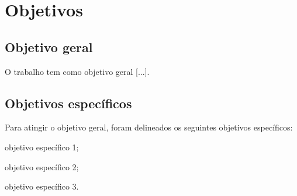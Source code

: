 \chapter{Objetivos}

\section{Objetivo geral}
O trabalho tem como objetivo geral [...].

\section{Objetivos específicos}
Para atingir o objetivo geral, foram delineados os seguintes objetivos específicos:
\begin{alineas}
  \item objetivo específico 1;
  \item objetivo específico 2;
  \item objetivo específico 3.
\end{alineas}
